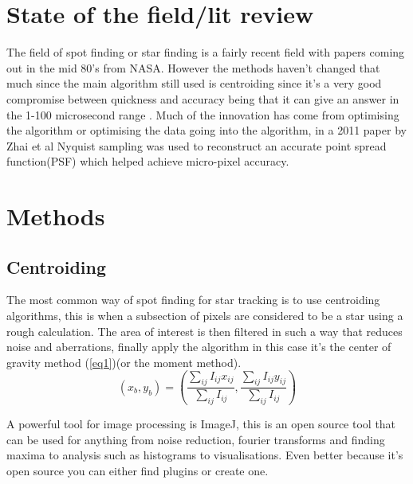 \documentclass[aps,pra,a4paper,nofootinbib,onecolumn,tightenlines,longbibliography,12pt,amsfonts,amssymb,amsmath,floatfix]{revtex4-2} %
\begin{document}
  



\section{State of the field/lit review} %
\label{sec:State of the field/lit review}


The field of spot finding or star finding is a fairly recent field with papers
coming out in the mid 80's from NASA. However the methods haven't changed that
much since the main algorithm still used is centroiding since it's a very good
compromise between quickness and accuracy being that it can give an answer in
the 1-100 microsecond range \cite{delabie2014accurate}. Much of the innovation
has come from optimising the algorithm or optimising the data going into the
algorithm, in a 2011 paper by Zhai et al\cite{zhai2011micro} Nyquist sampling
was used to reconstruct an accurate point spread function(PSF) which helped
achieve micro-pixel accuracy.


\section{Methods} %
\label{sec:Background}

  \subsection{Centroiding} %
  \label{sub:Centroiding_meth}
  
  
  
  The most common way of spot finding for star tracking is to use centroiding
  algorithms, this is when a subsection of pixels are considered to be a star
  using a rough calculation. The area of interest is then filtered in such a way
  that reduces noise and aberrations, finally apply the algorithm in this case
  it's the center of gravity method (\ref{eq1})(or the moment
  method)\cite{delabie2014accurate}\cite{stone1989comparison}.
  \begin{equation}\label{eq1}
      (x_b,y_b) = \left( {\frac{\sum_{ij} I_{ij}x_{ij}}{\sum_{ij} I_{ij}},\frac{\sum_{ij} I_{ij}y_{ij}}{\sum_{ij} I_{ij}}}\right)
  \end{equation}
  
  A powerful tool for image processing is ImageJ, this is an open source tool
  that can be used for anything from noise reduction, fourier transforms and
  finding maxima to analysis such as histograms to visualisations. 
  Even better because it's open source you can either find plugins or create one.
  \cite{van2019single}
  
\end{document}
